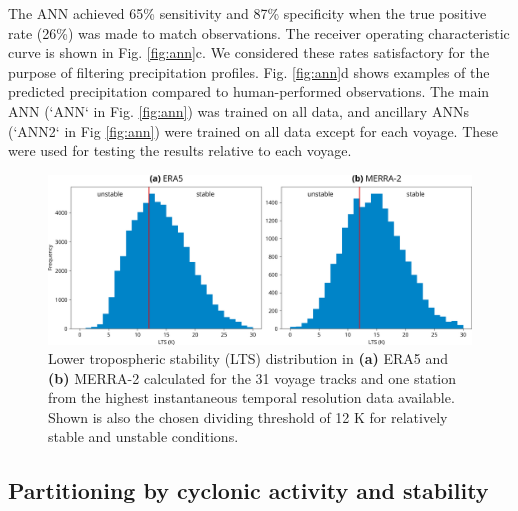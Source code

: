 \documentclass[12pt,a4paper]{article}
\begin{document}
The ANN achieved 65\% sensitivity and 87\% specificity when the true positive
rate (26\%) was made to match observations. The receiver operating
characteristic curve is shown in Fig. \ref{fig:ann}c. We considered these rates
satisfactory for the purpose of filtering precipitation profiles. Fig.
\ref{fig:ann}d shows examples of the predicted precipitation compared to
human-performed observations. The main ANN (`ANN` in Fig. \ref{fig:ann}) was trained on all data, and ancillary ANNs (`ANN2` in Fig \ref{fig:ann}) were trained on all data except for each voyage. These were used for testing the results relative to each voyage.

\begin{figure}[b!]
\centering
\includegraphics[width=\textwidth]{img/lts_dist.pdf}
\caption{
Lower tropospheric stability (LTS) distribution in \textbf{(a)} ERA5 and
\textbf{(b)} MERRA-2 calculated for the 31 voyage tracks and one station from
the highest instantaneous temporal resolution data available. Shown is also the
chosen dividing threshold of 12 K for relatively stable and unstable
conditions.
}
\label{fig:lts}
\end{figure}

\subsection{Partitioning by cyclonic activity and stability}
\label{sec:cyclone-stability}
\end{document}
